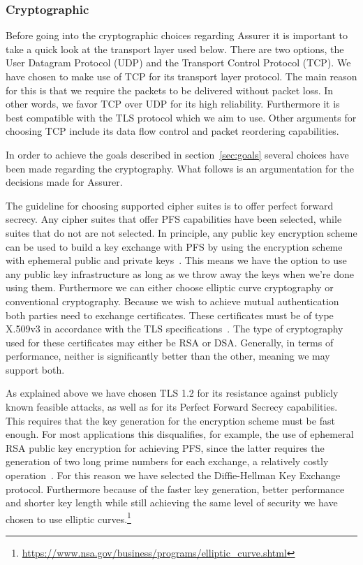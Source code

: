 \subsubsection{Cryptographic}
Before going into the cryptographic choices regarding Assurer it is important to take a quick look at the transport layer used below. There are two options, the User Datagram Protocol (UDP) and the Transport Control Protocol (TCP). We have chosen to make use of TCP for its transport layer protocol. The main reason for this is that we require the packets to be delivered without packet loss. In other words, we favor TCP over UDP for its high reliability. Furthermore it is best compatible with the TLS protocol which we aim to use. Other arguments for choosing TCP include its data flow control and packet reordering capabilities.

In order to achieve the goals described in section~\ref{sec:goals} several choices have been made regarding the cryptography. What follows is an argumentation for the decisions made for Assurer. 

The guideline for choosing supported cipher suites is to offer perfect forward secrecy. Any cipher suites that offer PFS capabilities have been selected, while suites that do not are not selected. In principle, any public key encryption scheme can be used to build a key exchange with PFS by using the encryption scheme with ephemeral public and private keys~\cite{PFS}. This means we have the option to use any public key infrastructure as long as we throw away the keys when we're done using them. Furthermore we can either choose elliptic curve cryptography or conventional cryptography. Because we wish to achieve mutual authentication both parties need to exchange certificates. These certificates must be of type X.509v3 in accordance with the TLS specifications~\cite{tls1.2}. The type of cryptography used for these certificates may either be RSA or DSA. Generally, in terms of performance, neither is significantly better than the other, meaning we may support both. 

As explained above we have chosen TLS 1.2 for its resistance against publicly known feasible attacks, as well as for its Perfect Forward Secrecy capabilities. This requires that the key generation for the encryption scheme must be fast enough. For most applications this disqualifies, for example, the use of ephemeral RSA public key encryption for achieving PFS, since the latter requires the generation of two long prime numbers for each exchange, a relatively costly operation~\cite{PFS}. For this reason we have selected the Diffie-Hellman Key Exchange protocol. Furthermore because of the faster key generation, better performance and shorter key length while still achieving the same level of security we have chosen to use elliptic curves.\footnote{\url{https://www.nsa.gov/business/programs/elliptic_curve.shtml}}

